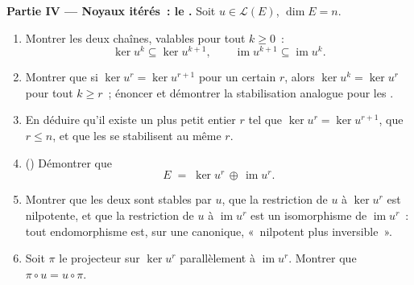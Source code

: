 \begin{problem}
\medskip
\noindent\textbf{Partie IV --- Noyaux itérés~: le .}
Soit $u \in \mathcal{L}(E)$, $\dim E = n$.
\begin{enumerate}[resume]
  \item Montrer les deux chaînes, valables pour tout $k \geq 0$~:
        \[
        \ker u^k \subseteq \ker u^{k+1},
        \qquad
        \operatorname{im} u^{k+1} \subseteq \operatorname{im}
        u^k .
        \]
  \item Montrer que si $\ker u^{r} = \ker u^{r+1}$ pour un certain $r$,
        alors $\ker u^{k} = \ker u^{r}$ pour tout $k \geq r$~; énoncer
        et démontrer la stabilisation analogue pour les .
  \item En déduire qu'il existe un plus petit entier $r$ tel que $\ker
        u^{r} = \ker u^{r+1}$, que $r \leq n$, et que les 
        se stabilisent au même $r$.
  \item () Démontrer que
        \[
        E \;=\; \ker u^{r} \,\oplus\, \operatorname{im} u^{r} .
        \]
  \item Montrer que les deux  sont stables par $u$, que la
        restriction de $u$ à $\ker u^{r}$ est nilpotente, et que
        la restriction de $u$ à $\operatorname{im} u^{r}$ est un
        isomorphisme de $\operatorname{im} u^{r}$~: tout
        endomorphisme est, sur une  canonique, «~nilpotent
        plus inversible~».
  \item Soit $\pi$ le projecteur sur $\ker u^{r}$ parallèlement à
        $\operatorname{im} u^{r}$. Montrer que $\pi \circ u = u
        \circ \pi$.
\end{enumerate}


\end{problem}

